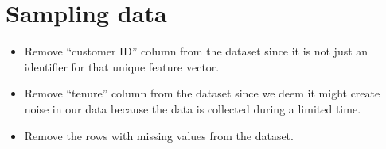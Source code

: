\section{Sampling data}

\begin{itemize}
    \item Remove ``customer ID'' column from the dataset since it is not just an identifier for that unique feature vector.
    \item Remove ``tenure'' column from the dataset since we deem it might create noise in our data because the data is collected during a limited time.
    \item Remove the rows with missing values from the dataset.
\end{itemize}
